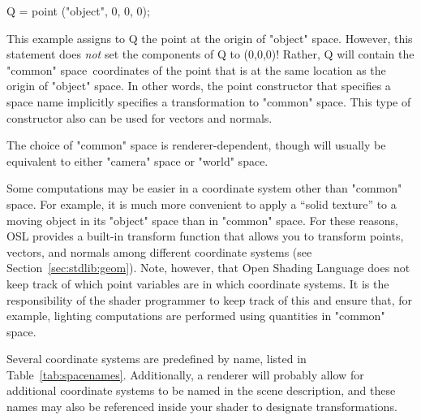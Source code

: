 \documentclass[11pt,letterpaper]{book}
\def\langname{Open Shading Language\xspace}
\def\commonspace{{\cf "common"} space\xspace}
\def\worldspace{{\cf "world"} space\xspace}
\def\cameraspace{{\cf "camera"} space\xspace}
\def\objectspace{{\cf "object"} space\xspace}
\begin{document}
\begin{code}
    Q = point ("object", 0, 0, 0);
\end{code}

This example assigns to {\cf Q} the point at the origin of
\objectspace.  However, this statement does \emph{not} set the
components of {\cf Q} to (0,0,0)!  Rather, {\cf Q} will contain the
\commonspace\ coordinates of the point that is at the same location as
the origin of \objectspace.  In other words, the point constructor that
specifies a space name implicitly specifies a transformation
to \commonspace.  This type of constructor also can be used for vectors
and normals.

The choice of \commonspace is renderer-dependent, though will usually
be equivalent to either \cameraspace or \worldspace.

Some computations may be easier in a coordinate system other than
\commonspace.  For example, it is much more convenient to apply a
``solid texture'' to a moving object in its \objectspace than in
\commonspace.  For these reasons, OSL provides a built-in
{\cf transform} function that
allows you to transform points, vectors, and normals 
among different coordinate systems (see Section~\ref{sec:stdlib:geom}).  Note,
however, that \langname does not keep track of which point variables are
in which coordinate systems.  It is the responsibility of the shader
programmer to keep track of this and ensure that, for example, lighting
computations are performed using quantities in \commonspace.

Several coordinate systems are predefined by name, listed in
Table~\ref{tab:spacenames}.  Additionally, a renderer will probably
allow for additional coordinate systems to be named in the scene
description, and these names may also be referenced inside your shader
to designate transformations.
\end{document}
